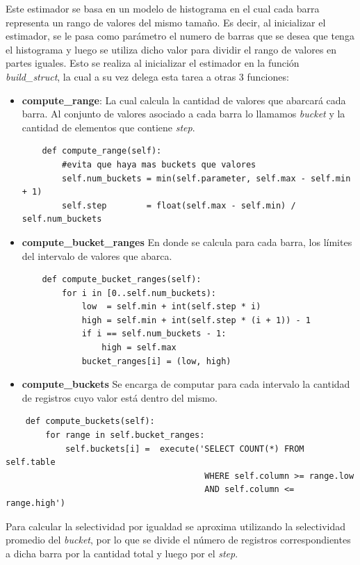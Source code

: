 \documentclass[a4paper, 10pt, twoside]{article}
\begin{document}
Este estimador se basa en un modelo de histograma en el cual cada barra representa un rango
de valores del mismo tamaño.
Es decir, al inicializar el estimador, se le pasa como parámetro el numero de barras que se
desea que tenga el histograma
y luego se utiliza dicho valor para dividir el rango de valores en partes iguales.
Esto se realiza al inicializar el estimador en la función \textit{build\_struct}, la cual a su vez delega esta tarea
a otras 3 funciones:
\begin{itemize}
\item \textbf{compute\_range}: La cual calcula la cantidad de valores que abarcará cada barra. Al conjunto de valores asociado
a cada barra lo llamamos \textit{bucket} y la cantidad de elementos que contiene \textit{step}.
\begin{verbatim}
    def compute_range(self):
    	#evita que haya mas buckets que valores
        self.num_buckets = min(self.parameter, self.max - self.min + 1)
        self.step        = float(self.max - self.min) / self.num_buckets
\end{verbatim}
\item \textbf{compute\_bucket\_ranges} En donde se calcula para cada barra, los límites del intervalo de valores
que abarca.
\begin{verbatim}
    def compute_bucket_ranges(self):
        for i in [0..self.num_buckets):
            low  = self.min + int(self.step * i)
            high = self.min + int(self.step * (i + 1)) - 1
            if i == self.num_buckets - 1:
                high = self.max
            bucket_ranges[i] = (low, high)
\end{verbatim}
\item \textbf{compute\_buckets} Se encarga de computar para cada intervalo la cantidad de registros cuyo valor está dentro del mismo.   
\end{itemize}
\begin{verbatim}
    def compute_buckets(self):
        for range in self.bucket_ranges:
            self.buckets[i] =  execute('SELECT COUNT(*) FROM self.table
                                        WHERE self.column >= range.low
                                        AND self.column <= range.high')
\end{verbatim}

Para calcular la selectividad por igualdad se aproxima utilizando la selectividad promedio del \textit{bucket}, por lo que se divide el número de registros correspondientes a dicha barra por la cantidad total y luego por el \textit{step}.
\end{document}
